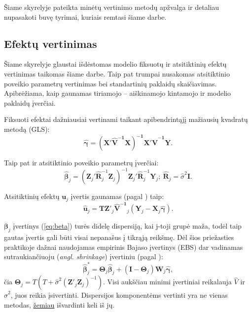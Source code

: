 \documentclass[11pt,a4paper]{article}
\begin{document}
\indent Šiame skyrelyje pateikta minėtų vertinimo metodų apžvalga ir detaliau nupasakoti buvę tyrimai, kuriais remtasi šiame darbe.

\subsection{Efektų vertinimas}
\indent Šiame skyrelyje glaustai išdėstomas modelio fiksuotų ir atsitiktinių efektų vertinimas taikomas šiame darbe. Taip pat trumpai nusakomas atsitiktinio poveikio parametrų vertinimas bei standartinių paklaidų skaičiavimas. Apibrėžiama, kaip gaunamas tiriamojo -- aiškinamojo kintamojo ir modelio paklaidų įverčiai.

\indent Fiksuoti efektai dažniausiai vertinami taikant apibendrintąjį mažiausių kvadratų metodą (GLS):
\begin{equation}\label{eq:gamma}
\boldsymbol{\hat{\gamma}}=\mathbf{\left(X'\hat{V}^{-1}X\right)^{-1}X'\hat{V}^{-1}Y}.
\end{equation}

Taip pat ir atsitiktinio poveikio parametrų įverčiai:
\begin{equation} \label{eq:beta}
\boldsymbol{\hat{\beta}}_j=\left(\mathbf{Z}_j'\mathbf{\hat{R}}^{-1}_j\mathbf{Z}_j\right)^{-1}\mathbf{Z}_j'\mathbf{\hat{R}}^{-1}_j\mathbf{Y}_j;\ \mathbf{\hat{R}}_j=\hat{\sigma}^2\mathbf{I}.
\end{equation}

Atsitiktinių efektų $\mathbf{u}_j$ įvertis gaunamas (pagal \cite{EBi}) taip:
\begin{equation*}
\mathbf{\hat{u}}_j=\mathbf{TZ}'_j\mathbf{\hat{V}^{-1}}_j\left(\mathbf{Y}_j-\mathbf{X}_j\boldsymbol{\hat{\gamma}}\right).
\end{equation*}

$\boldsymbol{\beta}_j$ įvertinys (\ref{eq:beta}) turės didelę dispersiją, kai j-toji grupė maža, todėl taip gautas įvertis gali būti visai nepanašus į tikrąją reikšmę. Dėl šios priežasties praktikoje dažnai naudojamas empirinis Bajaso įvertinys (EBS) dar vadinamas sutraukiančiuoju (\textit{angl. shrinkage}) įvertiniu (pagal \cite{shrinkage}):
\begin{equation*}
\boldsymbol{\hat{\beta}}^*_{j}=\boldsymbol{\Theta}_j\boldsymbol{\hat{\beta}}_j+(\boldsymbol{I} - \boldsymbol{\Theta}_j)\mathbf{W}_j\boldsymbol{\hat{\gamma}},
\end{equation*}
čia $\mathbf{\Theta}_j=T\left(T+\hat{\sigma}^2(\mathbf{Z}'_j\mathbf{Z}_j)^{-1}\right)$. Visi aukščiau minimi įvertiniai reikalauja $\hat{V}$ ir $\hat{\sigma}^2$, juos reikia įsivertinti. Dispersijos komponentėms vertinti yra ne vienas metodas, \hyperlink{reml}{žemiau} išvardinti keli iš jų.
\end{document}
